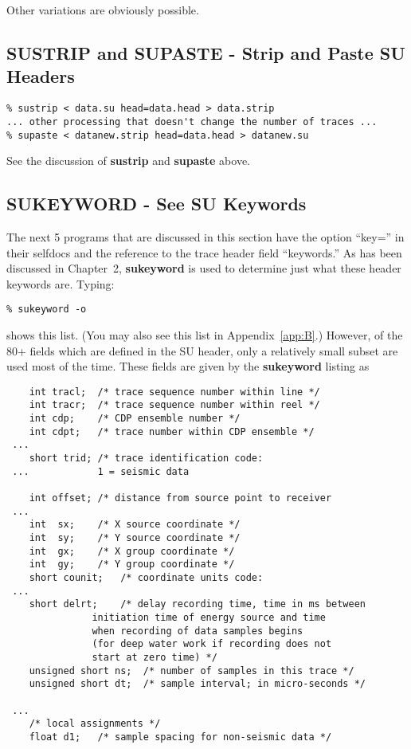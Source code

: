 {{{Other variations are obviously possible.
\subsection{SUSTRIP and SUPASTE - Strip and Paste SU Headers}
{\small\begin{verbatim}
% sustrip < data.su head=data.head > data.strip
... other processing that doesn't change the number of traces ...
% supaste < datanew.strip head=data.head > datanew.su
\end{verbatim}}\noindent
See the discussion of {\bf sustrip\/} and {\bf supaste\/} above.

\subsection{SUKEYWORD - See SU Keywords \label{sukeyword}}
The next 5 programs that are discussed in this section have
the option ``key='' in their selfdocs and the reference to
the trace header field ``keywords.''
As has been discussed in Chapter~2, {\bf sukeyword\/} is used to
determine just what these header keywords are.
Typing:
{\small\begin{verbatim}
% sukeyword -o
\end{verbatim}}\noindent
shows this list. (You may also see this list in Appendix~\ref{app:B}.)
However, of the 80+ fields which are defined in the SU header,
only a relatively small subset are used most of the time. These 
fields are  given by the {\bf sukeyword\/} listing as
{\small\begin{verbatim}
	int tracl;	/* trace sequence number within line */
	int tracr;	/* trace sequence number within reel */
	int cdp;	/* CDP ensemble number */
	int cdpt;	/* trace number within CDP ensemble */
 ...
	short trid;	/* trace identification code:
 ...			1 = seismic data

	int offset;	/* distance from source point to receiver
 ...
	int  sx;	/* X source coordinate */
	int  sy;	/* Y source coordinate */
	int  gx;	/* X group coordinate */
	int  gy;	/* Y group coordinate */
	short counit;	/* coordinate units code:
 ...
	short delrt;	/* delay recording time, time in ms between
			   initiation time of energy source and time
			   when recording of data samples begins
			   (for deep water work if recording does not
			   start at zero time) */
	unsigned short ns;	/* number of samples in this trace */
	unsigned short dt;	/* sample interval; in micro-seconds */

 ...
	/* local assignments */
	float d1;	/* sample spacing for non-seismic data */


\end{verbatim}}}}}
